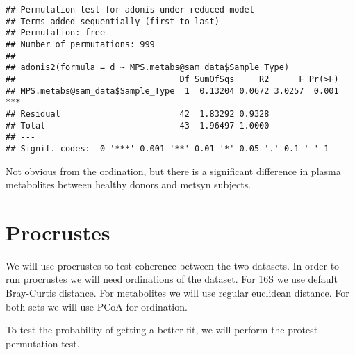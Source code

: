 \documentclass[
]{article}
\newenvironment{Shaded}{\begin{snugshade}}{\end{snugshade}}
\newcommand{\AttributeTok}[1]{\textcolor[rgb]{0.13,0.29,0.53}{#1}}
\newcommand{\CommentTok}[1]{\textcolor[rgb]{0.56,0.35,0.01}{\textit{#1}}}
\newcommand{\FloatTok}[1]{\textcolor[rgb]{0.00,0.00,0.81}{#1}}
\newcommand{\FunctionTok}[1]{\textcolor[rgb]{0.13,0.29,0.53}{\textbf{#1}}}
\newcommand{\NormalTok}[1]{#1}
\newcommand{\OtherTok}[1]{\textcolor[rgb]{0.56,0.35,0.01}{#1}}
\newcommand{\SpecialCharTok}[1]{\textcolor[rgb]{0.81,0.36,0.00}{\textbf{#1}}}
\newcommand{\StringTok}[1]{\textcolor[rgb]{0.31,0.60,0.02}{#1}}
\begin{document}
\begin{verbatim}
## Permutation test for adonis under reduced model
## Terms added sequentially (first to last)
## Permutation: free
## Number of permutations: 999
## 
## adonis2(formula = d ~ MPS.metabs@sam_data$Sample_Type)
##                                 Df SumOfSqs     R2      F Pr(>F)    
## MPS.metabs@sam_data$Sample_Type  1  0.13204 0.0672 3.0257  0.001 ***
## Residual                        42  1.83292 0.9328                  
## Total                           43  1.96497 1.0000                  
## ---
## Signif. codes:  0 '***' 0.001 '**' 0.01 '*' 0.05 '.' 0.1 ' ' 1
\end{verbatim}

Not obvious from the ordination, but there is a significant difference
in plasma metabolites between healthy donors and metsyn subjects.

\hypertarget{procrustes}{%
\section{Procrustes}\label{procrustes}}

We will use procrustes to test coherence between the two datasets. In
order to run procrustes we will need ordinations of the dataset. For 16S
we use default Bray-Curtis distance. For metabolites we will use regular
euclidean distance. For both sets we will use PCoA for ordination.

To test the probability of getting a better fit, we will perform the
protest permutation test.

\begin{Shaded}
\end{Shaded}
\end{document}
